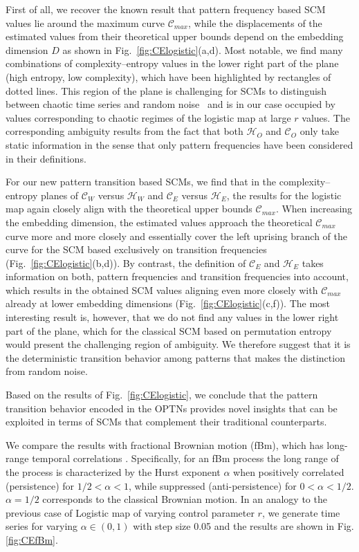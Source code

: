 \documentclass[12pt,aip,cha,reprint,nofootinbib]{revtex4-1}
\begin{document}
First of all, we recover the known result that pattern frequency based SCM values lie around the maximum curve $\mathcal{C}_{max}$, while the displacements of the estimated values from their theoretical upper bounds depend on the embedding dimension $D$ as shown in Fig.~\ref{fig:CElogistic}(a,d). Most notable, we find many combinations of complexity--entropy values in the lower right part of the plane (high entropy, low complexity), which have been highlighted by rectangles of dotted lines. This region of the plane is challenging for SCMs to distinguish between chaotic time series and random noise~\cite{BorgesAMC2019} and is in our case occupied by values corresponding to chaotic regimes of the logistic map at large $r$ values. The corresponding ambiguity results from the fact that both $\mathcal{H}_O$ and $\mathcal{C}_O$ only take static information in the sense that only pattern frequencies have been considered in their definitions. 

For our new pattern transition based SCMs, we find that in the complexity--entropy planes of $\mathcal{C}_W$ versus $\mathcal{H}_W$ and $\mathcal{C}_E$ versus $\mathcal{H}_E$, the results for the logistic map again closely align with the theoretical upper bounds $\mathcal{C}_{max}$. When increasing the embedding dimension, the estimated values approach the theoretical $\mathcal{C}_{max}$ curve more and more closely and essentially cover the left uprising branch of the curve for the SCM based exclusively on transition frequencies (Fig.~\ref{fig:CElogistic}(b,d)). By contrast, the definition of $\mathcal{C}_{E}$ and $\mathcal{H}_{E}$ takes information on both, pattern frequencies and transition frequencies into account, which results in the obtained SCM values aligning even more closely with $\mathcal{C}_{max}$ already at lower embedding dimensions (Fig.~\ref{fig:CElogistic}(c,f)). The most interesting result is, however, that we do not find any values in the lower right part of the plane, which for the classical SCM based on permutation entropy would present the challenging region of ambiguity. We therefore suggest that it is the deterministic transition behavior among patterns that makes the distinction from random noise. 

Based on the results of Fig.~\ref{fig:CElogistic}, we conclude that the pattern transition behavior encoded in the OPTNs provides novel insights that can be exploited in terms of SCMs that complement their traditional counterparts. 

We compare the results with fractional Brownian motion (fBm), which has long-range temporal correlations \cite{Mandelbrot1968}. Specifically, for an fBm process the long range of the process is characterized by the Hurst exponent $\alpha$ when positively correlated (persistence) for $1/2 < \alpha < 1$, while suppressed (anti-persistence) for $0< \alpha < 1/2$. $\alpha=1/2$ corresponds to the classical Brownian motion. In an analogy to the previous case of Logistic map of varying control parameter $r$, we generate time series for varying $\alpha \in (0, 1)$ with step size 0.05 and the results are shown in Fig. \ref{fig:CEfBm}. 
\end{document}

